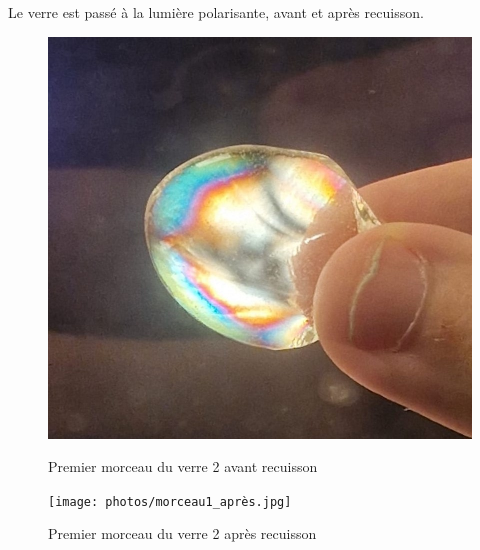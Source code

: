 \documentclass{article}
\begin{document}
Le verre est passé à la lumière polarisante, avant et après recuisson.

\begin{figure}[ht]
    \centering
    \begin{minipage}{0.3\textwidth}
        \centering
        \includegraphics[width=\textwidth]{photos/morceau1_avant.jpg}
        \caption{Premier morceau du verre 2 avant recuisson}
    \end{minipage}
    \hspace{0.5cm}
    \begin{minipage}{0.3\textwidth}
        \centering
        \texttt{[image: photos/morceau1\_après.jpg]}
        \caption{Premier morceau du verre 2 après recuisson}
    \end{minipage}
\end{figure}
\end{document}
